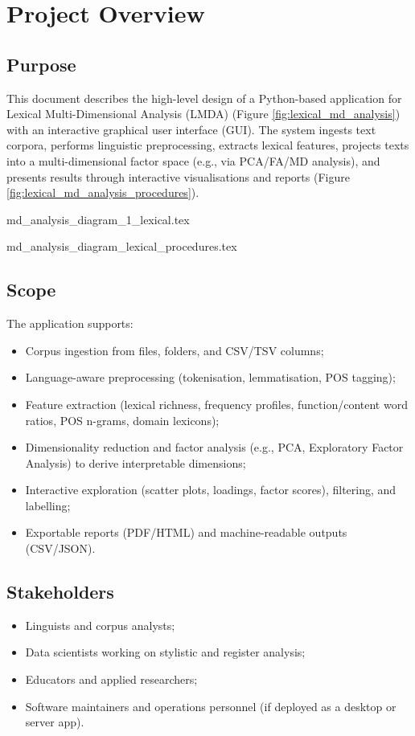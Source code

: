 \section{Project Overview}
\subsection{Purpose}
This document describes the high-level design of a Python-based application for Lexical Multi-Dimensional Analysis (LMDA) (Figure \ref{fig:lexical_md_analysis}) with an interactive graphical user interface (GUI). The system ingests text corpora, performs linguistic preprocessing, extracts lexical features, projects texts into a multi-dimensional factor space (e.g., via PCA/FA/MD analysis), and presents results through interactive visualisations and reports (Figure \ref{fig:lexical_md_analysis_procedures}).

{md_analysis_diagram_1_lexical.tex}

{md_analysis_diagram_lexical_procedures.tex}

\subsection{Scope}
The application supports:
\begin{itemize}
    \item Corpus ingestion from files, folders, and CSV/TSV columns;
    \item Language-aware preprocessing (tokenisation, lemmatisation, POS tagging);
    \item Feature extraction (lexical richness, frequency profiles, function/content word ratios, POS n-grams, domain lexicons);
    \item Dimensionality reduction and factor analysis (e.g., PCA, Exploratory Factor Analysis) to derive interpretable dimensions;
    \item Interactive exploration (scatter plots, loadings, factor scores), filtering, and labelling;
    \item Exportable reports (PDF/HTML) and machine-readable outputs (CSV/JSON).
\end{itemize}

\subsection{Stakeholders}
\begin{itemize}
    \item Linguists and corpus analysts;
    \item Data scientists working on stylistic and register analysis;
    \item Educators and applied researchers;
    \item Software maintainers and operations personnel (if deployed as a desktop or server app).
\end{itemize}


